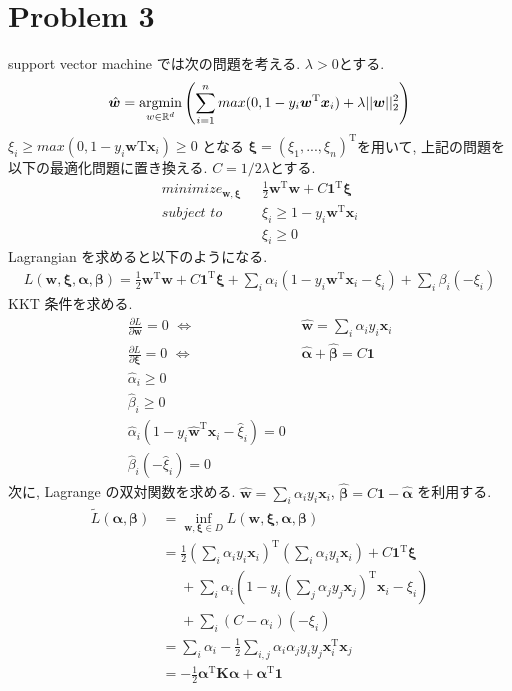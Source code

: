 \documentclass[a4paper,10pt]{jsarticle}
\newcommand{\argmin}{\mathop{\rm argmin}\limits}
\begin{document}
\section*{Problem 3}
support vector machine では次の問題を考える. $\lambda > 0$とする.
\begin{equation}
 \hat{\bm{w}} = \argmin_{w \in \mathbb{R}^d}
  \left(\sum_{i=1}^{n}max(0, 1 - y_i\bm{w}^\mathrm{T}\bm{x}_i)
   + \lambda||\bm{w}||^2_2 \right)
\end{equation}
$\xi_i \geq max(0, 1 - y_i\bm{w}\mathrm{T}\bm{x}_i) \geq 0$ となる
$\bm{\xi} = (\xi_1, ..., \xi_n)^\mathrm{T}$を用いて,
上記の問題を以下の最適化問題に置き換える.
$C=1/2\lambda$とする.
\begin{align*}
 minimize_{\bm{w}, \bm{\xi}} \,\,\,\,
 & \frac{1}{2}\bm{w}^\mathrm{T}\bm{w} + C\bm{1}^\mathrm{T}\bm{\xi}\\
 subject \,\, to \,\,\,\, &\xi_i \geq 1 - y_i\bm{w}^\mathrm{T}\bm{x}_i\\
 &\xi_i \geq 0
\end{align*}
Lagrangian を求めると以下のようになる.
\begin{align*}
 L(\bm{w}, \bm{\xi}, \bm{\alpha}, \bm{\beta})
 = \frac{1}{2}\bm{w}^\mathrm{T}\bm{w} + C\bm{1}^\mathrm{T}\bm{\xi}
 + \sum_{i}\alpha_i(1 - y_i\bm{w}^\mathrm{T}\bm{x}_i - \xi_i)
 + \sum_{i}\beta_i(-\xi_i)
\end{align*}
KKT 条件を求める.
\begin{align*}
 \frac{\partial L}{\partial \bm{w}} = 0 \,\, \Longleftrightarrow
 &\,\,\hat{\bm{w}} = \sum_{i}\alpha_iy_i\bm{x}_i\\
 \frac{\partial L}{\partial \bm{\xi}} = 0 \,\, \Longleftrightarrow
 &\,\,\hat{\bm{\alpha}} + \hat{\bm{\beta}} = C\bm{1}\\
 \hat{\alpha}_i \geq 0\\
 \hat{\beta}_i \geq 0\\
 \hat{\alpha}_i(1 - y_i\hat{\bm{w}}^\mathrm{T}\bm{x}_i - \hat{\xi}_i) = 0\\
 \hat{\beta}_i(- \hat{\xi}_i) = 0
\end{align*}
次に, Lagrange の双対関数を求める.
$\hat{\bm{w}}=\sum_{i}\alpha_iy_i\bm{x}_i$,
$\hat{\bm{\beta}} = C\bm{1} - \hat{\bm{\alpha}}$
を利用する.
\begin{align*}
 \tilde{L}(\bm{\alpha}, \bm{\beta})
 & = \inf_{\bm{w}, \bm{\xi} \in D}L(\bm{w}, \bm{\xi}, \bm{\alpha}, \bm{\beta})\\
 & = \frac{1}{2}\left(\sum_{i}\alpha_iy_i\bm{x}_i\right)^\mathrm{T}
 \left(\sum_{i}\alpha_iy_i\bm{x}_i\right)
 + C\bm{1}^\mathrm{T}\bm{\xi}\\
 &\,\,\,\,\,\,\,\,+ \sum_{i}\alpha_i\left(1 - y_i
 \left(\sum_{j}\alpha_jy_j\bm{x}_j\right)^\mathrm{T}\bm{x}_i-\xi_i\right)\\
 &\,\,\,\,\,\,\,\,+ \sum_i(C - \alpha_i)(-\xi_i)\\
 & = \sum_i\alpha_i - \frac{1}{2}\sum_{i,j}\alpha_i\alpha_jy_iy_j
 \bm{x}^\mathrm{T}_i\bm{x}_j\\
 & = -\frac{1}{2}\bm{\alpha}^\mathrm{T}\bm{K}\mathrm{\bm{\alpha}}
 + \bm{\alpha}^\mathrm{T}\bm{1}
\end{align*}
\end{document}
